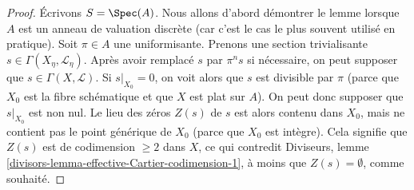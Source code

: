 \begin{proof}
Écrivons $S = \Spec(A)$. Nous allons d'abord démontrer le lemme lorsque $A$ est un
anneau de valuation discrète (car c'est le cas le plus souvent utilisé en pratique).
Soit $\pi \in A$ une uniformisante.
Prenons une section trivialisante $s \in \Gamma(X_\eta, \mathcal{L}_\eta)$.
Après avoir remplacé $s$ par $\pi^n s$ si nécessaire,
on peut supposer que $s \in \Gamma(X, \mathcal{L})$.
Si $s|_{X_0} = 0$, on voit alors
que $s$ est divisible par $\pi$ (parce que $X_0$ est la fibre
schématique et que $X$ est plat sur $A$). On peut donc supposer que $s|_{X_0}$
est non nul. Le lieu des zéros $Z(s)$ de $s$ est alors contenu dans $X_0$,
mais ne contient pas le point générique de $X_0$ (parce que $X_0$ est intègre).
Cela signifie que $Z(s)$ est de codimension $\geq 2$ dans $X$, ce qui contredit
Diviseurs, lemme \ref{divisors-lemma-effective-Cartier-codimension-1},
à moins que $Z(s) = \emptyset$, comme souhaité.


\end{proof}
